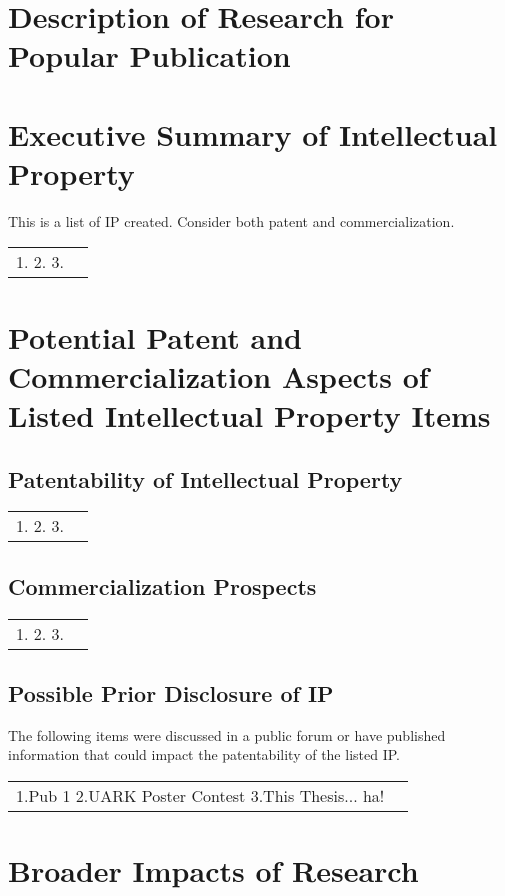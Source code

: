  \chapter{Description of Research for Popular Publication}
 
 \chapter{Executive Summary of Intellectual Property}
 This is a list of IP created. Consider both patent and commercialization.
 \begin{tabular}{cc}
 	1.
 	2.
 	3.
 \end{tabular}
 
 \chapter{Potential Patent and Commercialization Aspects of Listed Intellectual Property Items}
 \section{Patentability of Intellectual Property}
 \begin{tabular}{cc}
 	1.
 	2.
 	3.
 \end{tabular}
 \section{Commercialization Prospects}
 
 \begin{tabular}{cc}
 	1.
 	2.
 	3.
 \end{tabular}
 \section{Possible Prior Disclosure of IP}
 The following items were discussed in a public forum or have published information that could impact the patentability of the listed IP.
 \begin{tabular}{cc}
 	1.Pub 1
 	2.UARK Poster Contest
 	3.This Thesis... ha!
 \end{tabular}
 
 \chapter{Broader Impacts of Research}
